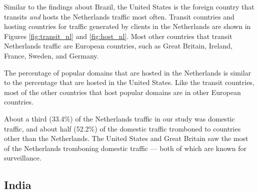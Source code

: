 Similar to the findings about Brazil, the United States is the foreign country that transits {\it and} hosts the Netherlands traffic most often.  Transit countries and hosting countries for traffic generated by clients in the Netherlands are shown in Figures \ref{fig:transit_nl} and \ref{fig:host_nl}.  Most other countries that transit Netherlands traffic are European countries, such as Great Britain, Ireland, France, Sweden, and Germany.



The percentage of popular domains that are hosted in the Netherlands is similar to the percentage that are hosted in the United States.  Like the transit countries, most of the other countries that host popular domains are in other European countries.

About a third (33.4\%) of the Netherlands traffic in our study was domestic traffic, and about half (52.2\%) of the domestic traffic tromboned to countries other than the Netherlands.  The United States and Great Britain saw the most of the Netherlands tromboning domestic traffic --- both of which are known for surveillance.


\subsection{India}


